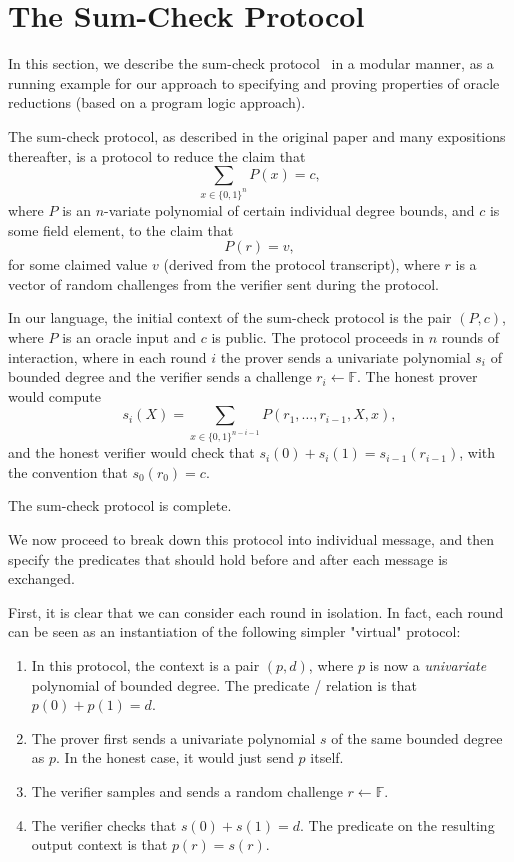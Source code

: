 \section{The Sum-Check Protocol}\label{sec:sumcheck}

In this section, we describe the sum-check protocol~\cite{sumcheck-protocol} in a modular manner, as a running example for our approach to specifying and proving properties of oracle reductions (based on a program logic approach).

The sum-check protocol, as described in the original paper and many expositions thereafter, is a
protocol to reduce the claim that \[ \sum_{x \in \{0, 1\}^n} P(x) = c, \] where $P$ is an
$n$-variate polynomial of certain individual degree bounds, and $c$ is some field element, to the
claim that \[ P(r) = v, \] for some claimed value $v$ (derived from the protocol transcript), where
$r$ is a vector of random challenges from the verifier sent during the protocol.

In our language, the initial context of the sum-check protocol is the pair $(P, c)$, where $P$ is an
oracle input and $c$ is public. The protocol proceeds in $n$ rounds of interaction, where in each
round $i$ the prover sends a univariate polynomial $s_i$ of bounded degree and the verifier sends a
challenge $r_i \gets \mathbb{F}$. The honest prover would compute \[ s_i(X) = \sum_{x \in \{0,
1\}^{n - i - 1}} P(r_1, \ldots, r_{i - 1}, X, x), \] and the honest verifier would check that
$s_i(0) + s_i(1) = s_{i - 1}(r_{i - 1})$, with the convention that $s_0(r_0) = c$.

\begin{theorem}
    The sum-check protocol is complete.
\end{theorem}

We now proceed to break down this protocol into individual message, and then specify the predicates that should hold before and after each message is exchanged.

First, it is clear that we can consider each round in isolation. In fact, each round can be seen as an instantiation of the following simpler "virtual" protocol:
\begin{enumerate}
    \item In this protocol, the context is a pair $(p, d)$, where $p$ is now a \emph{univariate} polynomial of bounded degree. The predicate / relation is that $p(0) + p(1) = d$.
    \item The prover first sends a univariate polynomial $s$ of the same bounded degree as $p$. In
    the honest case, it would just send $p$ itself.
    \item The verifier samples and sends a random challenge $r \gets \mathbb{F}$.
    \item The verifier checks that $s(0) + s(1) = d$. The predicate on the resulting output context
    is that $p(r) = s(r)$.
\end{enumerate}

